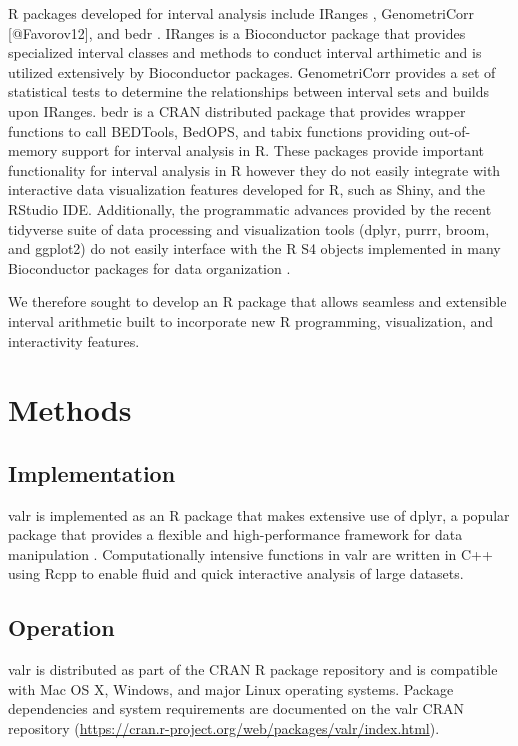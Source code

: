 \documentclass[9pt,a4paper]{extarticle}
\begin{document}
R packages developed for interval analysis include IRanges \cite{lawrence_software_2013}, GenometriCorr [@Favorov12], and bedr \cite{haider_bedr_2016}. IRanges is a Bioconductor package that provides specialized interval classes and methods to conduct interval arthimetic and is utilized extensively by Bioconductor packages. GenometriCorr provides a set of statistical tests to determine the relationships between interval sets and builds upon IRanges. bedr is a CRAN distributed package that provides wrapper functions to call BEDTools, BedOPS, and tabix functions providing out-of-memory support for interval analysis in R. These packages provide important functionality for interval analysis in R however they do not easily integrate with interactive data visualization features developed for R, such as Shiny\cite{chang_shiny_2017}, and the RStudio IDE. Additionally, the programmatic advances provided by the recent tidyverse suite of data processing and visualization tools (dplyr, purrr, broom, and ggplot2) do not easily interface with the R S4 objects implemented in many Bioconductor packages for data organization \cite{wickham_tidyverse_2017}. 

We therefore sought to develop an R package that allows seamless and extensible interval arithmetic built to incorporate new R programming, visualization, and interactivity features.

\section*{Methods}
\subsection*{Implementation}
valr is implemented as an R package that makes extensive use of dplyr, a popular package that provides a flexible and high-performance framework for data manipulation \cite{wickham_dplyr_2016}. Computationally intensive functions in valr are written in C++ using Rcpp to enable fluid and quick interactive analysis of large datasets\cite{eddelbuettel_rcpp_2011}. 

\subsection*{Operation}
valr is distributed as part of the CRAN R package repository and is compatible with Mac OS X, Windows, and major Linux operating systems. Package dependencies and system requirements are documented on the valr CRAN repository (\url{https://cran.r-project.org/web/packages/valr/index.html}).
\end{document}
